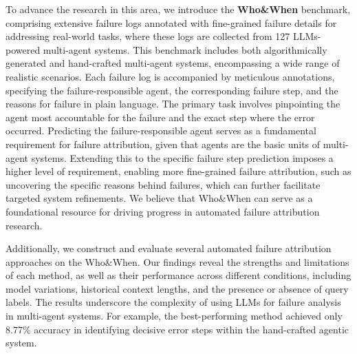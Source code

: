 To advance the research in this area, we introduce the \textbf{Who\&When} benchmark, comprising extensive failure logs annotated with fine-grained failure details for addressing real-world tasks, where these logs are collected from 127 LLMs-powered multi-agent systems.
This benchmark includes both algorithmically generated and hand-crafted multi-agent systems, encompassing a wide range of realistic scenarios.
Each failure log is accompanied by meticulous annotations, specifying the failure-responsible agent, the corresponding failure step, and the reasons for failure in plain language. 
The primary task involves pinpointing the agent most accountable for the failure and the exact step where the error occurred. 
Predicting the failure-responsible agent serves as a fundamental requirement for failure attribution, given that agents are the basic units of multi-agent systems. Extending this to the specific failure step prediction imposes a higher level of requirement, enabling more fine-grained failure attribution, such as uncovering the specific reasons behind failures, which can further facilitate targeted system refinements. We believe that Who\&When can serve as a foundational resource for driving progress in automated failure attribution research.

Additionally, we construct and evaluate several automated failure attribution approaches on the Who\&When. Our findings reveal the strengths and limitations of each method, as well as their performance across different conditions, including model variations, historical context lengths, and the presence or absence of query labels. The results underscore the complexity of using LLMs for failure analysis in multi-agent systems. For example, the best-performing method achieved only 8.77\% accuracy in identifying decisive error steps within the hand-crafted agentic system.